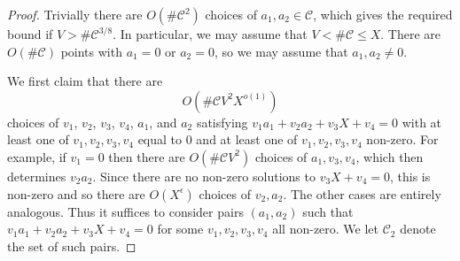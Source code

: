 \documentclass[10pt]{amsart}
\theoremstyle{plain}
\numberwithin{sblmm}{thrm}
\numberwithin{equation}{section}
\begin{document}
%
%
%
%
\begin{proof}
%
Trivially there are $O(\#\mathcal{C}^2)$ choices of $a_1,a_2\in\mathcal{C}$, which gives the required bound if $V>\#\mathcal{C}^{3/8}$. In particular, we may assume that $V< \#\mathcal{C}\le X$. There are $O(\#\mathcal{C})$ points with $a_1=0$ or $a_2=0$, so we may assume that $a_1,a_2\ne 0$.

We first claim that there are
%
\begin{equation}
O(\#\mathcal{C} V^2 X^{o(1)})\label{eq:ZeroTerms}
\end{equation}
%
choices of $v_1$, $v_2$, $v_3$, $v_4$, $a_1$, and $a_2$ satisfying $v_1a_1+v_2a_2+v_3X+v_4=0$ with at least one of $v_1,v_2,v_3,v_4$ equal to $0$ and at least one of $v_1,v_2,v_3,v_4$ non-zero. For example, if $v_1=0$ then there are $O(\#\mathcal{C}V^2)$ choices of $a_1,v_3,v_4$, which then determines $v_2a_2$. Since there are no non-zero solutions to $v_3X+v_4=0$, this is non-zero and so there are $O(X^\epsilon)$ choices of $v_2,a_2$. The other cases are entirely analogous. Thus it suffices to consider pairs $(a_1,a_2)$ such that $v_1a_1+v_2a_2+v_3X+v_4=0$ for some $v_1,v_2,v_3,v_4$ all non-zero. We let $\mathcal{C}_2$ denote the set of such pairs.


\end{proof}
\end{document}
